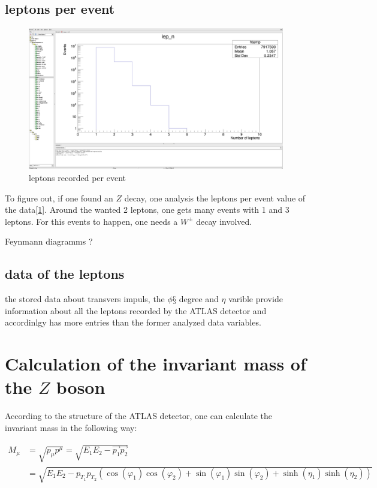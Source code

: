 \documentclass[12pt, a4paper, bibliography=totoc]{scrreprt}
\begin{document}
\subsection{leptons per event}
\begin{figure}
	\centering
	\includegraphics[scale=0.15]{fig/number_produced_leptons.png}
	\caption{leptons recorded per event}
	\label{lep_n}
\end{figure}
To figure out, if one found an $Z$ decay, one analysis the leptons per event value of the data[\ref{lep_n}].
Around the wanted 2 leptons, one gets many events with 1 and 3 leptons. For this events to happen, one needs a $W^{\pm}$ decay involved.

Feynmann diagramms ?

\subsection{data of the leptons}
the stored data about transvers impuls, the $\phi§$ degree and $\eta$ varible provide information about all the leptons recorded by the ATLAS detector and accordinlgy has more entries than the former analyzed data variables.

\section{Calculation of the invariant mass of the $Z$ boson}
According to the structure of the ATLAS detector, one can calculate the invariant mass in the following way:

\begin{align}
	M_{\mu} &= \sqrt{p_{\mu}p^{\mu}} = \sqrt{E_{1}E_{2}-\vec{p_{1}}\vec{p_{2}}}\\
			&= \sqrt{E_{1}E_{2}-p_{T_{1}}p_{T_{2}} (\cos(\varphi_{1})\cos(\varphi_{2})+\sin(\varphi_{1})\sin(\varphi_{2})+\sinh(\eta_{1})\sinh(\eta_{2}))}
\end{align}
\end{document}

